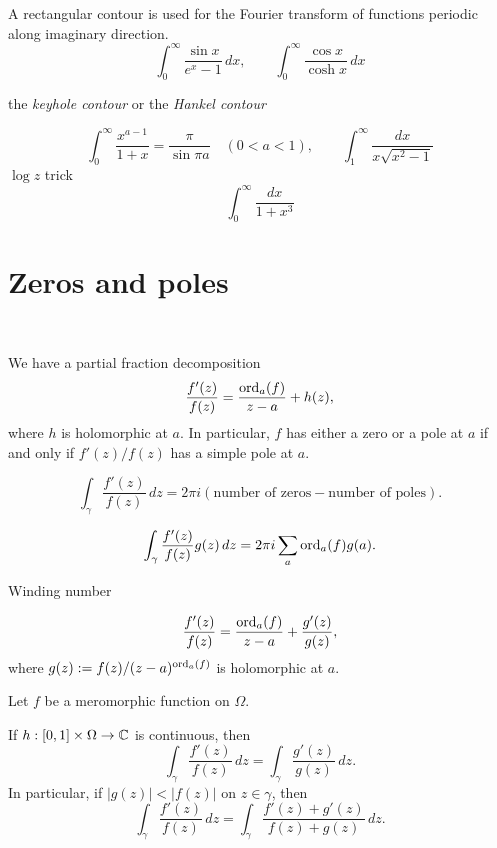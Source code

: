 \documentclass{../../large}
\begin{document}
\begin{prb}
A rectangular contour is used for the Fourier transform of functions periodic along imaginary direction.
\[\int_0^\infty\frac{\sin x}{e^x-1}\,dx,\qquad\int_0^\infty\frac{\cos x}{\cosh x}\,dx\]
\end{prb}

\begin{prb}
the \emph{keyhole contour} or the \emph{Hankel contour}

\[\int_0^\infty\frac{x^{a-1}}{1+x}=\frac\pi{\sin\pi a}\quad(0<a<1),\qquad\int_1^\infty\frac{dx}{x\sqrt{x^2-1}}\]
$\log z$ trick
\[\int_0^\infty\frac{dx}{1+x^3}\]
\end{prb}






\section{Zeros and poles}
\begin{prb}\,
\begin{parts}
\item We have a partial fraction decomposition
\[\frac{f'(z)}{f(z)}=\frac{\operatorname{ord}_a(f)}{z-a}+h(z),\]
where $h$ is holomorphic at $a$.
In particular, $f$ has either a zero or a pole at $a$ if and only if $f'(z)/f(z)$ has a simple pole at $a$.
\item
\[\int_\gamma\frac{f'(z)}{f(z)}\,dz=2\pi i(\text{number of zeros}-\text{number of poles}).\]
\item
\[\int_\gamma\frac{f'(z)}{f(z)}g(z)\,dz=2\pi i\sum_a\operatorname{ord}_a(f)g(a).\]
\item Winding number
\end{parts}
\end{prb}
\begin{pf}
\[\frac{f'(z)}{f(z)}=\frac{\operatorname{ord}_a(f)}{z-a}+\frac{g'(z)}{g(z)},\]
where $g(z):=f(z)/(z-a)^{\operatorname{ord}_a(f)}$ is holomorphic at $a$.
\end{pf}


\begin{prb}
Let $f$ be a meromorphic function on $\Omega$.
\begin{parts}
\item
If $h:[0,1]\times\Omega\to\mathbb{C}$ is continuous, then 
\[\int_\gamma\frac{f'(z)}{f(z)}\,dz=\int_\gamma\frac{g'(z)}{g(z)}\,dz.\]
In particular, if $|g(z)|<|f(z)|$ on $z\in\gamma$, then
\[\int_\gamma\frac{f'(z)}{f(z)}\,dz=\int_\gamma\frac{f'(z)+g'(z)}{f(z)+g(z)}\,dz.\]
\end{parts}
\end{prb}
\end{document}

